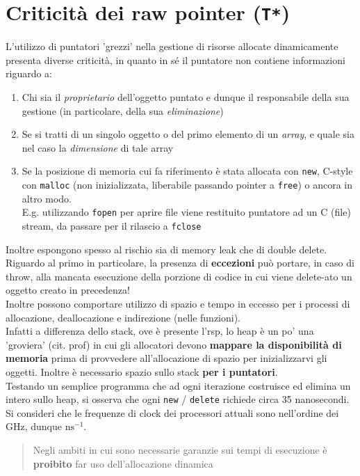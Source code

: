 \documentclass[10pt, oneside]{book}
\begin{document}
\section{Criticità dei raw pointer (\texttt{T*})}
L'utilizzo di puntatori 'grezzi' nella gestione di risorse allocate dinamicamente presenta diverse criticità, in quanto in sé il puntatore non contiene informazioni riguardo a:
\begin{enumerate}
\item Chi sia il \textit{proprietario} dell'oggetto puntato e dunque il responsabile della sua gestione (in particolare, della sua \textit{eliminazione})
\item Se si tratti di un singolo oggetto o del primo elemento di un \textit{array}, e quale sia nel caso la \textit{dimensione} di tale array
\item Se la posizione di memoria cui fa riferimento è stata allocata con \texttt{new}, C-style con \texttt{malloc} (non inizializzata, liberabile passando pointer a \texttt{free}) o ancora in altro modo.\\
E.g. utilizzando \texttt{fopen} per aprire file viene restituito puntatore ad un C (file) stream, da passare per il rilascio a \texttt{fclose}
\end{enumerate}
Inoltre espongono spesso al rischio sia di memory leak che di double delete.\\
Riguardo al primo in particolare, la presenza di \textbf{eccezioni} può portare, in caso di throw, alla mancata esecuzione della porzione di codice in cui viene delete-ato un oggetto creato in precedenza!\\
Inoltre possono comportare utilizzo di spazio e tempo in eccesso per i processi di allocazione, deallocazione e indirezione (nelle funzioni).\\
Infatti a differenza dello stack, ove è presente l'rsp, lo heap è un po' una 'groviera' (cit. prof) in cui gli allocatori devono \textbf{mappare la disponibilità di memoria} prima di provvedere all'allocazione di spazio per inizializzarvi gli oggetti. Inoltre è necessario spazio sullo stack \textbf{per i puntatori}.\\
Testando un semplice programma che ad ogni iterazione costruisce ed elimina un intero sullo heap, si osserva che ogni \texttt{new} / \texttt{delete} richiede circa 35 nanosecondi. Si consideri che le frequenze di clock dei processori attuali sono nell'ordine dei $\mathrm{GHz}$, dunque $\mathrm{ns^{-1}}$.

\begin{quote}
Negli ambiti in cui sono necessarie garanzie sui tempi di esecuzione è \textbf{proibito} far uso dell'allocazione dinamica
\end{quote}
\end{document}
